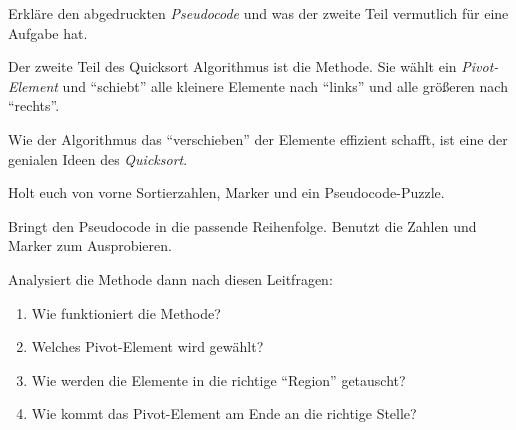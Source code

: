 \documentclass[9pt, a5paper, landscape, ngerman]{arbeitsblatt}
\begin{document}
\begin{aufgabe}
 Erkläre den abgedruckten \emph{Pseudocode} und was der zweite Teil  vermutlich für eine Aufgabe hat.
\end{aufgabe}

\clearpage
\TITEL[Quicksort 3]

Der zweite Teil des Quicksort Algorithmus ist die  Methode. Sie wählt ein \emph{Pivot-Element} und \enquote{schiebt} alle kleinere Elemente nach \enquote{links} und alle größeren nach \enquote{rechts}.

Wie der Algorithmus das \enquote{verschieben} der Elemente effizient schafft, ist eine der genialen Ideen des \emph{Quicksort}.

\begin{aufgabe}
	Holt euch von vorne Sortierzahlen, Marker und ein Pseudocode-Puzzle.

	Bringt den Pseudocode in die passende Reihenfolge. Benutzt die Zahlen und Marker zum Ausprobieren.

	Analysiert die Methode dann nach diesen Leitfragen:
	\begin{enumerate}
		\item Wie funktioniert die  Methode?
		\item Welches Pivot-Element wird gewählt?
		\item Wie werden die Elemente in die richtige \enquote{Region} getauscht?
		\item Wie kommt das Pivot-Element am Ende an die richtige Stelle?
	\end{enumerate}
\end{aufgabe}

\clearpage
\TITEL[Quicksort 4]





\end{document}
